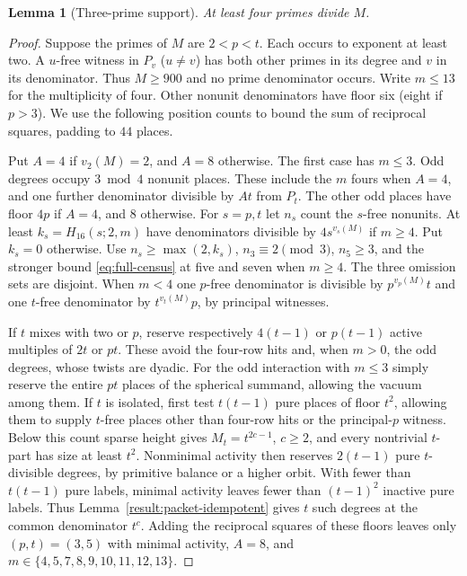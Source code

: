 \documentclass[11pt]{amsart}
\numberwithin{equation}{section}
\newtheorem{lemma}[theorem]{Lemma}
\theoremstyle{definition}
\theoremstyle{plain}
\begin{document}
\begin{lemma}[Three-prime support]\label{result.Three-prime-rank}
At least four primes divide $M$.
\end{lemma}
\begin{proof}
Suppose the primes of $M$ are $2<p<t$. Each occurs to
exponent at least two. A $u$-free witness in $P_v$ ($u\ne v$)
has both other primes in its degree and $v$ in its denominator.
Thus $M\ge900$ and no prime denominator occurs. Write $m\le13$ for
the multiplicity of four. Other nonunit denominators have floor six
(eight if $p>3$). We use the following position counts to bound the
sum of reciprocal squares, padding to $44$ places.

Put $A=4$ if $v_2(M)=2$, and $A=8$ otherwise. The first case has
$m\le3$. Odd degrees occupy $3\bmod4$ nonunit places. These include
the $m$ fours when $A=4$, and one further denominator divisible by
$At$ from $P_t$. The other odd places have floor $4p$ if $A=4$,
and $8$ otherwise. For $s=p,t$ let $n_s$ count the $s$-free
nonunits. At least $k_s=H_{16}(s;2,m)$ have denominators divisible
by $4s^{v_s(M)}$ if $m\ge4$. Put $k_s=0$ otherwise. Use
$n_s\ge\max(2,k_s)$, $n_3\equiv2\pmod3$, $n_5\ge3$, and the
stronger bound \eqref{eq:full-census} at five and seven when $m\ge4$.
The three omission sets are disjoint. When $m<4$ one $p$-free
denominator is divisible by $p^{v_p(M)}t$ and one $t$-free denominator
by $t^{v_t(M)}p$, by principal witnesses.

If $t$ mixes with two or $p$, reserve respectively $4(t-1)$ or
$p(t-1)$ active multiples of $2t$ or $pt$. These avoid the four-row
hits and, when $m>0$, the odd degrees, whose twists are dyadic. For
the odd interaction with $m\le3$ simply reserve the entire $pt$
places of the spherical summand, allowing the vacuum among them.
If $t$ is isolated, first test $t(t-1)$ pure places of floor $t^2$,
allowing them to supply $t$-free places other than four-row hits or
the principal-$p$ witness. Below this count sparse height gives
$M_t=t^{2c-1}$, $c\ge2$, and every nontrivial $t$-part has size
at least $t^2$. Nonminimal activity then reserves $2(t-1)$ pure
$t$-divisible degrees, by primitive balance or a higher orbit.
With fewer than $t(t-1)$ pure labels, minimal activity leaves fewer
than $(t-1)^2$ inactive pure labels. Thus Lemma~\ref{result:packet-idempotent} gives $t$
such degrees at the common denominator $t^c$.
Adding the reciprocal squares of these floors leaves only
$(p,t)=(3,5)$ with minimal activity, $A=8$, and
$m\in\{4,5,7,8,9,10,11,12,13\}$.


\end{proof}
\end{document}
